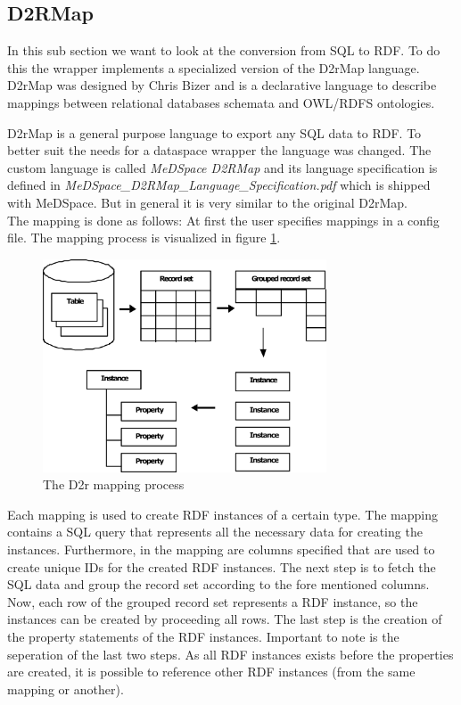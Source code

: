 \subsection{D2RMap}

In this sub section we want to look at the conversion from SQL to RDF. To do this the wrapper implements a specialized version of the D2rMap language. D2rMap was designed by Chris Bizer and is  a declarative language to describe mappings between relational databases schemata and OWL/RDFS ontologies\cite{D2rMap_aDatabaseToRdfMappingLanguage}.

D2rMap is a general purpose language to export any SQL data to RDF. To better suit the needs for a dataspace wrapper the language was changed. The custom language is called \emph{MeDSpace D2RMap} and its language specification is defined in \emph{MeDSpace\_D2RMap\_Language\_Specification.pdf} which is shipped with MeDSpace. But in general it is very similar to the original D2rMap.\\

The mapping is done as follows: At first the user specifies mappings in a config file. 
The mapping process is visualized in figure \ref{D2rMappingProcessFigure}.

\begin{figure}[H]
	\begin{center}
		\includegraphics[width=0.75\textwidth]{figures/MappingProcess.png}
	\end{center}
	\caption{The D2r mapping process \cite{D2rMap_aDatabaseToRdfMappingLanguage}}
	\label{D2rMappingProcessFigure}
\end{figure}

Each mapping is used to create RDF instances of a certain type. The mapping contains a SQL query that represents all the necessary data for creating the instances. Furthermore, in the mapping are columns specified that are used to create unique IDs for the created RDF instances.
The next step is to fetch the SQL data and group the record set according to the fore mentioned columns. Now, each row of the grouped record set represents a RDF instance, so the instances can be created by proceeding all rows. The last step is the creation of the property statements of the RDF instances. Important to note is the seperation of the last two steps. As all RDF instances exists before the properties are created, it is possible to reference other RDF instances (from the same mapping or another).

